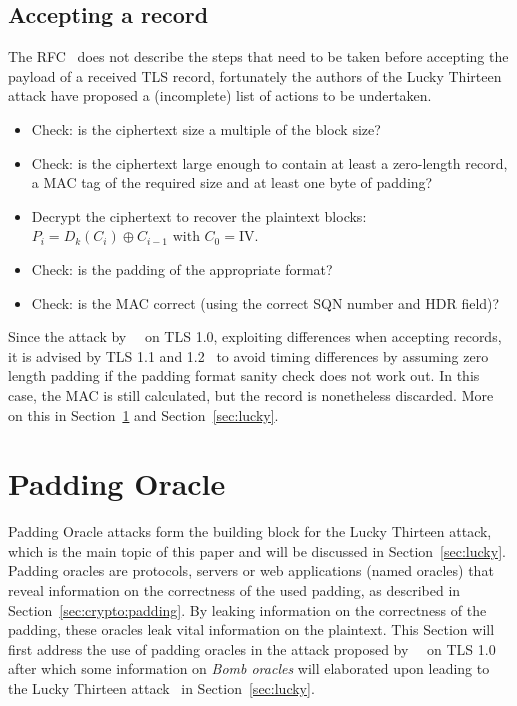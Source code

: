 \documentclass[10pt,conference,a4paper]{IEEEtran}
\begin{document}
\subsection{Accepting a record}
\label{sec:tls:accepting}
The RFC~\cite{ietf2008transport} does not describe the steps that need to be taken before accepting the payload of a received TLS record, fortunately the authors of the Lucky Thirteen attack have proposed a (incomplete) list of actions to be undertaken.
\begin{itemize}
  \item Check: is the ciphertext size a multiple of the block size?
  \item Check: is the ciphertext large enough to contain at least a zero-length record, a MAC tag of the required size and at least one byte of padding?
  \item Decrypt the ciphertext to recover the plaintext blocks: $P_i = D_k(C_i) \oplus C_{i-1} \text{ with } C_0 = \text{IV}$.
  \item Check: is the padding of the appropriate format?
  \item Check: is the MAC correct (using the correct SQN number and HDR field)?
\end{itemize}
Since the attack by~\citeauthor{vaudenay2002security}~\cite{vaudenay2002security} on TLS 1.0, exploiting differences when accepting records, it is advised by TLS 1.1 and 1.2~\cite{ietf2008transport} to avoid timing differences by assuming zero length padding if the padding format sanity check does not work out. In this case, the MAC is still calculated, but the record is nonetheless discarded. More on this in Section~\ref{sec:paddingoracle} and Section~\ref{sec:lucky}.




\section{Padding Oracle}
\label{sec:paddingoracle}
Padding Oracle attacks form the building block for the Lucky Thirteen attack, which is the main topic of this paper and will be discussed in Section~\ref{sec:lucky}. Padding oracles are protocols, servers or web applications (named oracles) that reveal information on the correctness of the used padding, as described in Section~\ref{sec:crypto:padding}. By leaking information on the correctness of the padding, these oracles leak vital information on the plaintext. This Section will first address the use of padding oracles in the attack proposed by~\citeauthor{vaudenay2002security}~\cite{vaudenay2002security} on TLS 1.0~\cite{dierks1999rfc} after which some information on \textit{Bomb oracles} will elaborated upon leading to the Lucky Thirteen attack~\cite{alfardan2013lucky} in Section~\ref{sec:lucky}.
\end{document}
